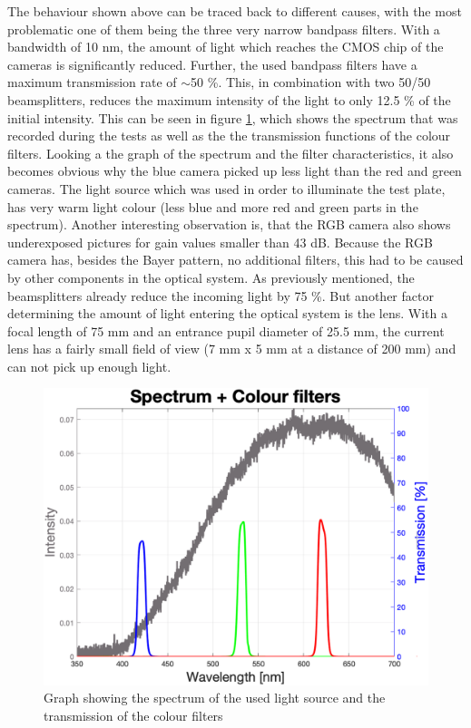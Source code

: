 The behaviour shown above can be traced back to different causes, with the most problematic one of them being the three very narrow bandpass filters. With a bandwidth of 10 nm, the amount of light which reaches the CMOS chip of the cameras is significantly reduced. Further, the used bandpass filters have a maximum transmission rate of $\sim$50 \%. This, in combination with two 50/50 beamsplitters, reduces the maximum intensity of the light to only 12.5 \% of the initial intensity. This can be seen in figure \ref{FilterOldSpec}, which shows the spectrum that was recorded during the tests as well as the the transmission functions of the colour filters. Looking a the graph of the spectrum and the filter characteristics, it also becomes obvious why the blue camera picked up less light than the red and green cameras. The light source which was used in order to illuminate the test plate, has very warm light colour (less blue and more red and green parts in the spectrum). Another interesting observation is, that the RGB camera also shows underexposed pictures for gain values smaller than 43 dB. Because the RGB camera has, besides the Bayer pattern, no additional filters, this had to be caused by other components in the optical system. As previously mentioned, the beamsplitters already reduce the incoming light by 75 \%. But another factor determining the amount of light entering the optical system is the lens. With a focal length of 75 mm and an entrance pupil diameter of 25.5 mm, the current lens has a fairly small field of view (7 mm x 5 mm at a distance of 200 mm) and can not pick up enough light.


\begin{figure}
\begin{center}
\includegraphics[width=12cm]{Pictures/SpectrumFilters}
\caption[Graph showing the spectrum of the used light source and the transmission of the colour filters]{Graph showing the spectrum of the used light source and the transmission of the colour filters}
\label{FilterOldSpec}
\end{center}
\end{figure}

